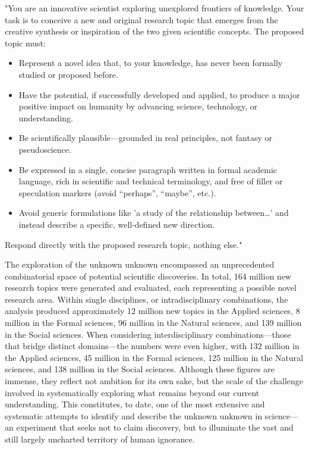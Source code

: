 "You are an innovative scientist exploring unexplored frontiers of knowledge. Your task is to conceive a new and original research topic that emerges from the creative synthesis or inspiration of the two given scientific concepts. The proposed topic must:

\begin{itemize}
\item Represent a novel idea that, to your knowledge, has never been formally studied or proposed before.

\item Have the potential, if successfully developed and applied, to produce a major positive impact on humanity by advancing science, technology, or understanding.

\item Be scientifically plausible—grounded in real principles, not fantasy or pseudoscience.

\item Be expressed in a single, concise paragraph written in formal academic language, rich in scientific and technical terminology, and free of filler or speculation markers (avoid “perhaps”, “maybe”, etc.).

\item Avoid generic formulations like 'a study of the relationship between…' and instead describe a specific, well-defined new direction.
\end{itemize}

Respond directly with the proposed research topic, nothing else."

\bigskip

The exploration of the unknown unknown encompassed an unprecedented combinatorial space of potential scientific discoveries. In total, 164 million new research topics were generated and evaluated, each representing a possible novel research area. Within single disciplines, or intradisciplinary combinations, the analysis produced approximately 12 million new topics in the Applied sciences, 8 million in the Formal sciences, 96 million in the Natural sciences, and 139 million in the Social sciences. When considering interdisciplinary combinations—those that bridge distinct domains—the numbers were even higher, with 132 million in the Applied sciences, 45 million in the Formal sciences, 125 million in the Natural sciences, and 138 million in the Social sciences. Although these figures are immense, they reflect not ambition for its own sake, but the scale of the challenge involved in systematically exploring what remains beyond our current understanding. This constitutes, to date, one of the most extensive and systematic attempts to identify and describe the unknown unknown in science—an experiment that seeks not to claim discovery, but to illuminate the vast and still largely uncharted territory of human ignorance.

